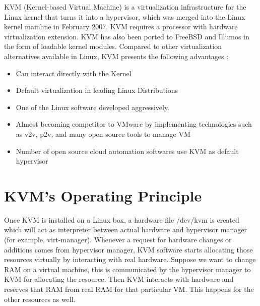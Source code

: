 KVM (Kernel-based Virtual Machine) is a virtualization infrastructure for the Linux kernel that turns it into a hypervisor, which was merged into the Linux kernel mainline in February 2007. KVM requires a processor with hardware virtualization extension. KVM has also been ported to FreeBSD and Illumos in the form of loadable kernel modules. 
Compared to other virtualization alternatives available in Linux, KVM presents the following advantages \citep{Reference20}:

    \begin{itemize}
	\item Can interact directly with the Kernel
	\item Default virtualization in leading Linux Distributions
	\item One of the Linux software developed aggressively.
	\item Almost becoming competitor to VMware by implementing technologies such as v2v, p2v, and many open source tools to manage VM
	\item Number of open source cloud automation softwares use KVM as default hypervisor 

    \end{itemize}


\section{KVM’s Operating Principle}

Once KVM is installed on a Linux box, a hardware file /dev/kvm is created which will act as interpreter between actual hardware and hypervisor manager (for example, virt-manager). 
Whenever a request for hardware changes or additions comes from hypervisor manager, KVM software starts allocating those resources virtually by interacting with real hardware. 
Suppose we want to change RAM on a virtual machine, this is communicated by the hypervisor manager to KVM for allocating the resource. 
Then KVM interacts with hardware and reserves that RAM from real RAM for that particular VM. This happens for the other resources as well.

